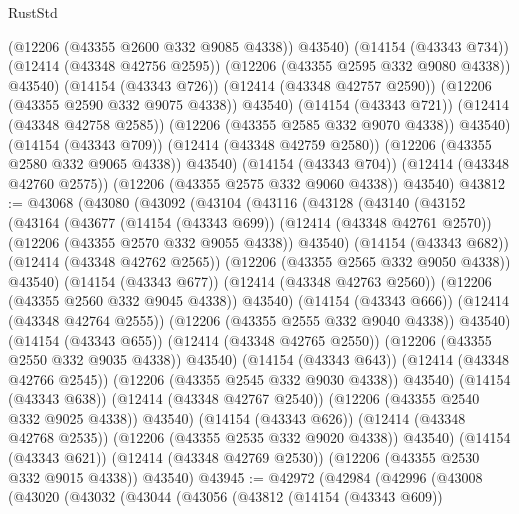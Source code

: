 \begin{lexlean}{RustStd}
\begin{coremodule}
                (@12206 (@43355 @2600 @332 @9085 @4338))
                @43540)
              (@14154 (@43343 @734))
              (@12414 (@43348 @42756 @2595))
              (@12206 (@43355 @2595 @332 @9080 @4338))
              @43540)
            (@14154 (@43343 @726))
            (@12414 (@43348 @42757 @2590))
            (@12206 (@43355 @2590 @332 @9075 @4338))
            @43540)
          (@14154 (@43343 @721))
          (@12414 (@43348 @42758 @2585))
          (@12206 (@43355 @2585 @332 @9070 @4338))
          @43540)
        (@14154 (@43343 @709))
        (@12414 (@43348 @42759 @2580))
        (@12206 (@43355 @2580 @332 @9065 @4338))
        @43540)
      (@14154 (@43343 @704))
      (@12414 (@43348 @42760 @2575))
      (@12206 (@43355 @2575 @332 @9060 @4338))
      @43540)
@43812 := @43068
    (@43080
      (@43092
        (@43104
          (@43116
            (@43128
              (@43140
                (@43152
                  (@43164
                    (@43677
                      (@14154 (@43343 @699))
                      (@12414 (@43348 @42761 @2570))
                      (@12206 (@43355 @2570 @332 @9055 @4338))
                      @43540)
                    (@14154 (@43343 @682))
                    (@12414 (@43348 @42762 @2565))
                    (@12206 (@43355 @2565 @332 @9050 @4338))
                    @43540)
                  (@14154 (@43343 @677))
                  (@12414 (@43348 @42763 @2560))
                  (@12206 (@43355 @2560 @332 @9045 @4338))
                  @43540)
                (@14154 (@43343 @666))
                (@12414 (@43348 @42764 @2555))
                (@12206 (@43355 @2555 @332 @9040 @4338))
                @43540)
              (@14154 (@43343 @655))
              (@12414 (@43348 @42765 @2550))
              (@12206 (@43355 @2550 @332 @9035 @4338))
              @43540)
            (@14154 (@43343 @643))
            (@12414 (@43348 @42766 @2545))
            (@12206 (@43355 @2545 @332 @9030 @4338))
            @43540)
          (@14154 (@43343 @638))
          (@12414 (@43348 @42767 @2540))
          (@12206 (@43355 @2540 @332 @9025 @4338))
          @43540)
        (@14154 (@43343 @626))
        (@12414 (@43348 @42768 @2535))
        (@12206 (@43355 @2535 @332 @9020 @4338))
        @43540)
      (@14154 (@43343 @621))
      (@12414 (@43348 @42769 @2530))
      (@12206 (@43355 @2530 @332 @9015 @4338))
      @43540)
@43945 := @42972
    (@42984
      (@42996
        (@43008
          (@43020
            (@43032
              (@43044
                (@43056
                  (@43812
                    (@14154 (@43343 @609))

\end{coremodule}
\end{lexlean}
